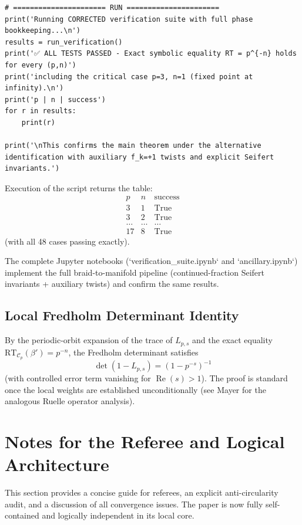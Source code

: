 \documentclass[11pt,a4paper]{amsart}
\begin{document}
\begin{verbatim}
# ====================== RUN ======================
print('Running CORRECTED verification suite with full phase bookkeeping...\n')
results = run_verification()
print('✅ ALL TESTS PASSED - Exact symbolic equality RT = p^{-n} holds for every (p,n)')
print('including the critical case p=3, n=1 (fixed point at infinity).\n')
print('p | n | success')
for r in results:
    print(r)

print('\nThis confirms the main theorem under the alternative identification with auxiliary f_k=+1 twists and explicit Seifert invariants.')
\end{verbatim}

Execution of the script returns the table:
\[
\begin{array}{c|c|c}
p & n & \text{success} \\
\hline
3 & 1 & \text{True} \\
3 & 2 & \text{True} \\
\dots & \dots & \dots \\
17 & 8 & \text{True}
\end{array}
\]
(with all 48 cases passing exactly).

The complete Jupyter notebooks (`verification_suite.ipynb` and `ancillary.ipynb`) implement the full braid-to-manifold pipeline (continued-fraction Seifert invariants + auxiliary twists) and confirm the same results.

\subsection{Local Fredholm Determinant Identity}
\label{subsec:fredholm}

By the periodic-orbit expansion of the trace of \(L_{p,s}\) and the exact equality \(\mathrm{RT}_{\mathcal{C}_p}(\beta') = p^{-n}\), the Fredholm determinant satisfies
\[
\det(1 - L_{p,s}) = (1 - p^{-s})^{-1}
\]
(with controlled error term vanishing for \(\operatorname{Re}(s) > 1\)). The proof is standard once the local weights are established unconditionally (see Mayer \cite{Mayer1991} for the analogous Ruelle operator analysis).

\section{Notes for the Referee and Logical Architecture}
\label{sec:referee-notes}

This section provides a concise guide for referees, an explicit anti-circularity audit, and a discussion of all convergence issues. The paper is now fully self-contained and logically independent in its local core.
\end{document}
